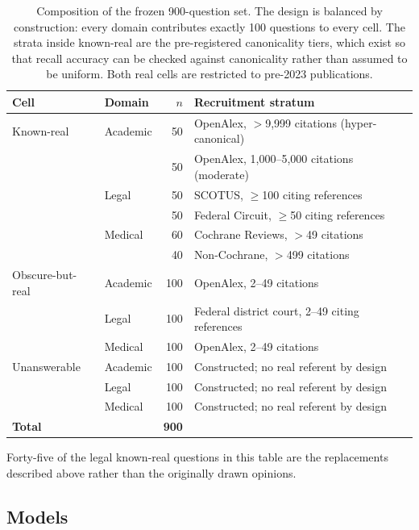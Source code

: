 \begin{table}[htbp]
\centering
\small
\caption{Composition of the frozen 900-question set. The design is balanced by
construction: every domain contributes exactly 100 questions to every cell. The
strata inside known-real are the pre-registered canonicality tiers, which exist
so that recall accuracy can be checked against canonicality rather than assumed
to be uniform. Both real cells are restricted to pre-2023 publications.}
\label{tab:dataset}
\begin{tabular}{@{}l l r l@{}}
\toprule
Cell & Domain & $n$ & Recruitment stratum \\
\midrule
Known-real       & Academic & 50  & OpenAlex, $>$9{,}999 citations (hyper-canonical) \\
                 &          & 50  & OpenAlex, 1{,}000--5{,}000 citations (moderate) \\
                 & Legal    & 50  & SCOTUS, $\geq$100 citing references \\
                 &          & 50  & Federal Circuit, $\geq$50 citing references \\
                 & Medical  & 60  & Cochrane Reviews, $>$49 citations \\
                 &          & 40  & Non-Cochrane, $>$499 citations \\
\midrule
Obscure-but-real & Academic & 100 & OpenAlex, 2--49 citations \\
                 & Legal    & 100 & Federal district court, 2--49 citing references \\
                 & Medical  & 100 & OpenAlex, 2--49 citations \\
\midrule
Unanswerable     & Academic & 100 & Constructed; no real referent by design \\
                 & Legal    & 100 & Constructed; no real referent by design \\
                 & Medical  & 100 & Constructed; no real referent by design \\
\midrule
\textbf{Total}   &          & \textbf{900} & \\
\bottomrule
\end{tabular}
\end{table}

Forty-five of the legal known-real questions in this table are the replacements
described above rather than the originally drawn opinions.

\subsection{Models}

